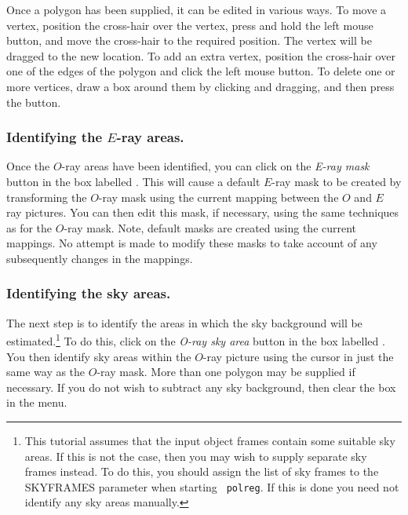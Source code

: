 Once a polygon has been supplied, it can be edited in various ways. To
move a vertex, position the cross-hair over the vertex, press and hold
the left mouse button, and move the cross-hair to the required position.
The vertex will be dragged to the new location. To add an extra vertex,
position the cross-hair over one of the edges of the polygon and click
the left mouse button. To delete one or more vertices, draw a box around 
them by clicking and dragging, and then press the  button.

\subsubsection {Identifying the $E$-ray areas.}
Once the $O$-ray areas have been identified, you can click on the {\em
E-ray mask} button in the box labelled . This will cause a default $E$-ray mask to be
created by transforming the $O$-ray mask using the current mapping
between the $O$ and $E$ ray pictures. You can then edit this mask, if
necessary, using the same techniques as for the $O$-ray mask. Note,
default masks are created using the current mappings. No attempt is made
to modify these masks to take account of any subsequently changes in
the mappings.

\subsubsection {Identifying the sky areas.}
The next step is to identify the areas in which the sky background will
be estimated.\footnote{This tutorial assumes that the input object frames
contain some suitable sky areas. If this is not the case, then you may
wish to supply separate sky frames instead. To do this, you should assign
the list of sky frames to the SKYFRAMES parameter when starting {\tt
polreg}. If this is done you need not identify any sky areas manually.}
To do this, click on the {\em O-ray sky area} button in the box labelled
. You then identify sky areas
within the $O$-ray picture using the cursor in just the same way as the
$O$-ray mask. More than one polygon may be supplied if necessary. If you
do not wish to subtract any sky background, then clear the
 box in the
 menu.

